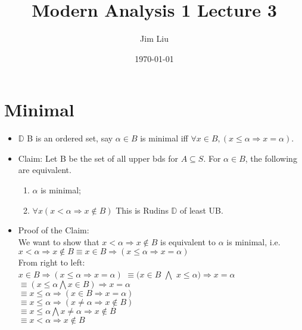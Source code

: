 \documentclass[11pt]{article}
\author{Jim Liu}
\date{\today}
\title{Modern Analysis 1 Lecture 3}
\begin{document}
\maketitle
\tableofcontents

\section{Minimal}
\label{sec:orge28720b}
\begin{itemize}
\item \(\mathbb{D}\) B is an ordered set, say \(\alpha \in B\) is minimal iff \(\forall x \in B, (x \leq \alpha \Rightarrow x = \alpha)\).
\item Claim: Let B be the set of all upper bds for \(A \subseteq S\). For \(\alpha \in B\), the following are equivalent.
\begin{enumerate}
\item \(\alpha\) is minimal;
\item \(\forall x (x < \alpha \Rightarrow x \notin B)\) This is Rudins \(\mathbb{D}\) of least UB.
\end{enumerate}
\item Proof of the Claim:\\[0pt]
We want to show that \(x < \alpha \Rightarrow x \notin B\) is equivalent to \(\alpha\) is minimal, i.e. \(x < \alpha \Rightarrow x \notin B \equiv x \in B \Rightarrow (x \leq \alpha \Rightarrow x = \alpha)\) \\[0pt]
From right to left:\\[0pt]
\(x \in B \Rightarrow (x \leq \alpha \Rightarrow x = \alpha)\)
\(\equiv (x \in B\) \(\bigwedge\) \(x \leq \alpha) \Rightarrow x = \alpha\) \\[0pt]
\(\equiv (x \leq \alpha \bigwedge x \in B) \Rightarrow x = \alpha\)\\[0pt]
\(\equiv x \leq \alpha \Rightarrow (x \in B \Rightarrow x = \alpha)\)\\[0pt]
\(\equiv x \leq \alpha \Rightarrow (x \neq \alpha \Rightarrow x \notin B )\)\\[0pt]
\(\equiv x \leq \alpha \bigwedge x \neq \alpha \Rightarrow x \notin B\)\\[0pt]
\(\equiv x < \alpha \Rightarrow x \notin B\)
\end{itemize}
\end{document}
